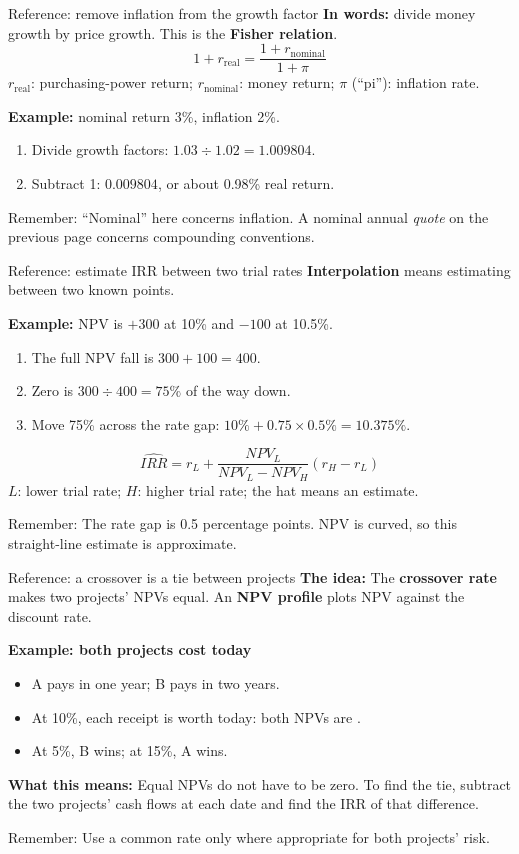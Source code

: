 \documentclass[10pt,aspectratio=169]{beamer}
\newcommand{\idea}[1]{\textbf{The idea:} #1\par\smallskip}
\newcommand{\inpractice}[1]{\par\smallskip\textbf{What this means:} #1}
\newcommand{\remember}[1]{\par\smallskip\alert{Remember:} #1}
\renewcommand{\pounds}{\ifmmode\text{\textsterling}\else\textsterling\fi}
\begin{document}
\begin{frame}[label=inflation]{Reference: remove inflation from the growth factor}
\textbf{In words:} divide money growth by price growth. This is the \textbf{Fisher relation}.
\[
1+r_{\mathrm{real}}=\frac{1+r_{\mathrm{nominal}}}{1+\pi}
\]
$r_{\mathrm{real}}$: purchasing-power return; $r_{\mathrm{nominal}}$: money return; $\pi$ (``pi''): inflation rate.
\par\smallskip
\textbf{Example:} nominal return 3\%, inflation 2\%.
\begin{enumerate}
\item Divide growth factors: $1.03\div1.02=1.009804$.
\item Subtract 1: $0.009804$, or about 0.98\% real return.
\end{enumerate}
\remember{``Nominal'' here concerns inflation. A nominal annual \emph{quote} on the previous page concerns compounding conventions.}
\end{frame}

\begin{frame}{Reference: estimate IRR between two trial rates}
\textbf{Interpolation} means estimating between two known points.
\par\smallskip
\textbf{Example:} NPV is $+300$ at 10\% and $-100$ at 10.5\%.
\begin{enumerate}
\item The full NPV fall is $300+100=400$.
\item Zero is $300\div400=75\%$ of the way down.
\item Move 75\% across the rate gap: $10\%+0.75\times0.5\%=10.375\%$.
\end{enumerate}
\[
\widehat{IRR}=r_L+\frac{NPV_L}{NPV_L-NPV_H}(r_H-r_L)
\]
$L$: lower trial rate; $H$: higher trial rate; the hat means an estimate.
\remember{The rate gap is 0.5 percentage points. NPV is curved, so this straight-line estimate is approximate.}
\end{frame}

\begin{frame}{Reference: a crossover is a tie between projects}
\idea{The \textbf{crossover rate} makes two projects' NPVs equal. An \textbf{NPV profile} plots NPV against the discount rate.}
\textbf{Example: both projects cost \pounds90 today}
\begin{itemize}
\item A pays \pounds110 in one year; B pays \pounds121 in two years.
\item At 10\%, each receipt is worth \pounds100 today: both NPVs are \pounds10.
\item At 5\%, B wins; at 15\%, A wins.
\end{itemize}
\inpractice{Equal NPVs do not have to be zero. To find the tie, subtract the two projects' cash flows at each date and find the IRR of that difference.}
\remember{Use a common rate only where appropriate for both projects' risk.}
\end{frame}
\end{document}
